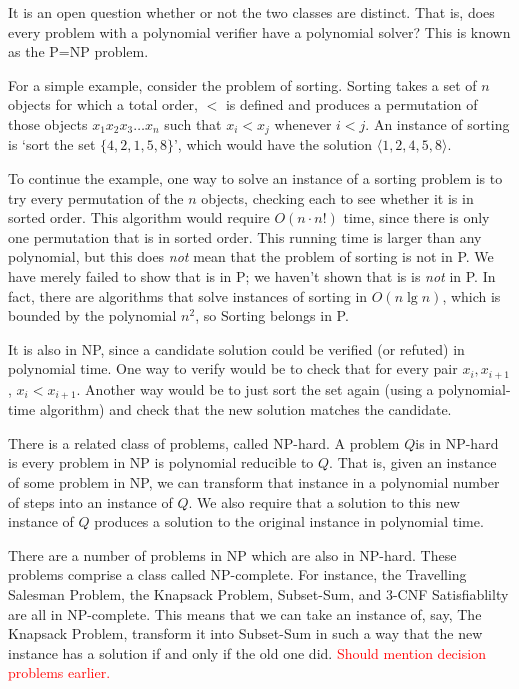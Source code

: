 \documentclass[12pt]{article}
\begin{document}
It is an open question whether or not the two classes are distinct. That is, does every problem with a polynomial verifier have a polynomial solver? This is known as the P=NP problem.

For a simple example, consider the problem of sorting.  Sorting takes a set of $n$ objects for which a total order, $<$ is defined and produces a permutation of those objects $x_1 x_2 x_3 \ldots x_n$ such that $x_i < x_j$ whenever $i < j$. An instance of sorting is `sort the set $\{4, 2 ,1, 5, 8\}$', which would have the solution $\langle 1, 2, 4, 5, 8 \rangle$. 

To continue the example, one way to solve an instance of a sorting problem is to try every permutation of the $n$ objects, checking each to see whether it is in sorted order. This algorithm would require $O(n\cdot n!)$ time, since there is only one permutation that is in sorted order. This running time is larger than any polynomial, but this does \emph{not} mean that the problem of sorting is not in P. We have merely failed to show that is in P; we haven't shown that is is \emph{not} in P. In fact, there are algorithms that solve instances of sorting in $O(n \lg n)$, which is bounded by the polynomial $n^2$, so Sorting belongs in P. 

It is also in NP, since a candidate solution could be verified (or refuted) in polynomial time. One way to verify would be to check that for every pair $x_i, x_{i+1}$, $x_i < x_{i+1}$. Another way would be to just sort the set again (using a polynomial-time algorithm) and check that the new solution matches the candidate. 

There is a related class of problems, called NP-hard. A problem $Q$is in NP-hard is every problem in NP is polynomial reducible to $Q$. That is, given an instance of some problem in NP, we can transform that instance in a polynomial number of steps into an instance of $Q$. We also require that a solution to this new instance of $Q$ produces a solution to the original instance in polynomial time.

There are a number of problems in NP which are also in NP-hard. These problems comprise a class called NP-complete. For instance, the Travelling Salesman Problem, the Knapsack Problem, Subset-Sum, and 3-CNF Satisfiablilty are all in NP-complete. This means that we can take an instance of, say, The Knapsack Problem, transform it into Subset-Sum in such a way that the new instance has a solution if and only if the old one did. \textcolor{red}{Should mention decision problems earlier.}
\end{document}
